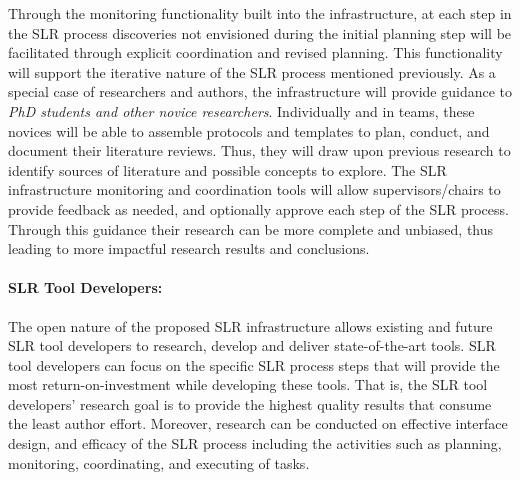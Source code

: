 Through the monitoring functionality built into the infrastructure, at each step in the SLR process discoveries not envisioned during the initial planning step will be facilitated through explicit coordination and revised planning.   
This functionality will support the iterative nature of the SLR process mentioned previously.   
As a special case of researchers and authors, the infrastructure will provide guidance to \textit{PhD students and other novice researchers}. 
Individually and in teams, these novices will be able to assemble protocols and templates to plan, conduct, and document their literature reviews. 
Thus, they will draw upon previous research to identify sources of literature and possible concepts to explore. 
The SLR infrastructure monitoring and coordination tools will allow supervisors/chairs to provide feedback as needed, and optionally approve each step of the SLR process. 
Through this guidance their research can be more complete and unbiased, thus leading to more impactful research results and conclusions. 


\paragraph{SLR Tool Developers:}
The open nature of the proposed SLR infrastructure allows existing and future SLR tool developers to research, develop and deliver state-of-the-art tools. 
SLR tool developers can focus on the specific SLR process steps that will provide the most return-on-investment while developing these tools.  
That is, the SLR tool developers' research goal is to provide the highest quality results that consume the least author effort.  
Moreover, research can be conducted on effective interface design, and efficacy of the SLR process including the activities such as planning, monitoring, coordinating, and executing of tasks.  

